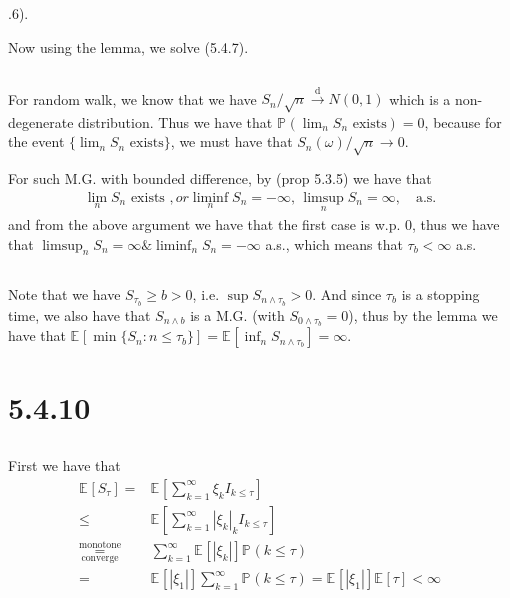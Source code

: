 \documentclass[11pt,a4paper]{ctexart}
\numberwithin{equation}{section}%
\begin{document}
.6).


Now using the lemma, we solve (5.4.7).

\subsection{}

For random walk, we know that we have $ S_n/\sqrt{n}\xrightarrow[]{\mathrm{d}} N(0,1) $ which is a non-degenerate distribution. Thus we have that $ \mathbb{P}_{  }\left( \lim_n S_n \text{ exists} \right)  = 0 $, because for the event $ \{\lim_n S_n \text{ exists}\} $, we must have that $ S_n(\omega )/\sqrt{n}\to 0 $. 

For such M.G. with bounded difference, by (prop 5.3.5) we have that 
\begin{align*}
    \lim_n S_n \text{ exists }, or \liminf_n S_n = -\infty,\, \limsup_n S_n = \infty,\quad \text{a.s.}
\end{align*}
and from the above argument we have that the first case is w.p. 0, thus we have that $ \limsup_n S_n = \infty \& \liminf_n S_n = -\infty $ a.s., which means that $ \tau_b<\infty $ a.s.

\subsection{}

Note that we have $ S_{\tau_b} \geq b >0 $, i.e. $ \sup S_{n\wedge \tau_b} >0 $. And since $ \tau_b $ is a stopping time, we also have that $ S_{n\wedge b} $ is a M.G. (with $ S_{0\wedge \tau_b}=0 $), thus by the lemma we have that $ \mathbb{E}_{  }\left[ \min\{S_n:n\leq \tau_b \}\right] =  \mathbb{E}_{  }\left[ \inf_n S_{n\wedge \tau_b} \right] = \infty  $.



\section{5.4.10}


\subsection{}
First we have that
\begin{align*}
    \mathbb{E}_{  }\left[ S_\tau \right]=& \mathbb{E}_{  }\left[ \sum_{k=1}^\infty \xi _k I_{k\leq \tau} \right] \\
    \leq& \mathbb{E}_{  }\left[ \sum_{k=1}^\infty \left\vert \xi _k \right\vert  _k I_{k\leq \tau} \right]\\
    \mathop{ = }\limits^{\text{monotone}}_{\text{converge}} & \sum_{k=1}^\infty \mathbb{E}_{  }\left[ \left\vert \xi _k \right\vert  \right] \mathbb{P}_{  }\left( k\leq \tau \right) \\
    =&\mathbb{E}_{  }\left[ \left\vert \xi _1 \right\vert  \right]\sum_{k=1}^\infty \mathbb{P}_{  }\left( k\leq \tau \right) = \mathbb{E}_{  }\left[ \left\vert \xi _1 \right\vert  \right] \mathbb{E}_{  }\left[ \tau \right] <\infty
\end{align*}
\end{document}
